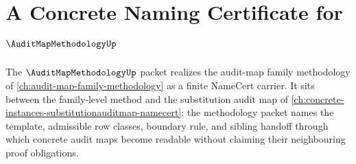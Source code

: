 \chapter{A Concrete Naming Certificate for $\AuditMapMethodologyUp$}
\label{ch:concrete-instances-auditmapmethodology-namecert}

The $\AuditMapMethodologyUp$ packet realizes the audit-map family methodology
of \autoref{ch:audit-map-family-methodology} as a finite NameCert carrier. It
sits between the family-level method and the substitution audit map of
\autoref{ch:concrete-instances-substitutionauditmap-namecert}: the methodology
packet names the template, admissible row classes, boundary rule, and sibling
handoff through which concrete audit maps become readable without claiming
their neighbouring proof obligations.

